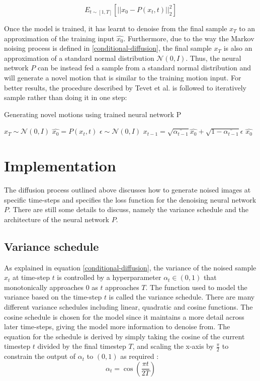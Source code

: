 \documentclass[a4paper, 12pt]{report}
\begin{document}
\begin{equation} \label{loss-function}
	E_{t \sim [1, T]}[{||x_0 - P(x_t, t)||}_2^2]
\end{equation}

Once the model is trained, it has learnt to denoise from the final sample \(x_T\) to an approximation of the training input \(\hat{x_0}\). Furthermore, due to the way the Markov noising process is defined in \ref{conditional-diffusion}, the final sample \(x_T\) is also an approximation of a standard normal distribution \(\mathcal{N}(0, I)\). Thus, the neural network \(P\) can be instead fed a sample from a standard normal distribution and will generate a novel motion that is similar to the training motion input. For better results, the procedure described by Tevet et al. \cite{tevet_human_2022} is followed to iteratively sample rather than doing it in one step:

\begin{algorithm}
	\caption{Generating novel motions using trained neural network P}
	\begin{algorithmic}[1]
		\State \(x_T \sim \mathcal{N}(0, I)\)
		\State \(\hat{x_0} = P(x_t, t)\)
		\State \(\epsilon \sim \mathcal{N}(0, I)\)
		\State \(x_{t-1} = \sqrt{\bar{\alpha_{t-1}}}\hat{x_0} + \sqrt{1 - \bar{\alpha_{t-1}}} \epsilon\)
		\EndFor
		\State \Return \(\hat{x_0}\)
	\end{algorithmic}
\end{algorithm}


\chapter{Implementation} \label{chap_implementation}
The diffusion process outlined above discusses how to generate noised images at specific time-steps and specifies the loss function for the denoising neural network \(P\). There are still some details to discuss, namely the variance schedule and the architecture of the neural network \(P\).

\section{Variance schedule}
As explained in equation \ref{conditional-diffusion}, the variance of the noised sample \(x_t\) at time-step \(t\) is controlled by a hyperparameter \(\alpha_t \in (0, 1)\) that monotonically approaches 0 as \(t\) approaches \(T\). The function used to model the variance based on the time-step \(t\) is called the variance schedule. There are many different variance schedules including linear, quadratic and cosine functions. The cosine schedule is chosen for the model since it maintains a more detail across later time-steps, giving the model more information to denoise from. The equation for the schedule is derived by simply taking the cosine of the current timestep \(t\) divided by the final timestep \(T\), and scaling the x-axis by \(\frac{\pi}{2}\) to constrain the output of \(\alpha_t\) to \((0, 1)\) as required \cite{nichol_improved_2021}:
\begin{equation}
	\alpha_t = \cos(\dfrac{\pi t}{2 T})
\end{equation}
\end{document}
